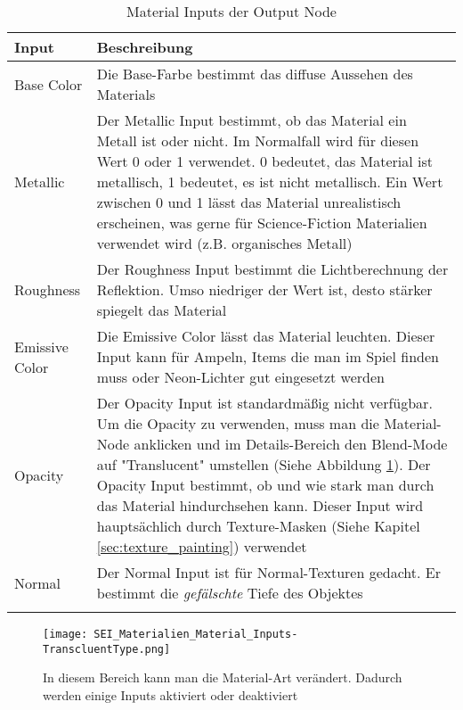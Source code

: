 \begin{longtable}{|p{4cm}|p{9.6cm}|}
    \hline
    \endfirsthead
    \textbf{Input} & \textbf{Beschreibung}\\
    \hline
    \endhead

    Base Color & Die Base-Farbe bestimmt das diffuse Aussehen des Materials \\
    \hline

    Metallic & Der Metallic Input bestimmt, ob das Material ein Metall ist oder nicht. Im Normalfall wird für
    diesen Wert 0 oder 1 verwendet. 0 bedeutet, das Material ist metallisch, 1 bedeutet, es ist nicht
    metallisch. Ein Wert zwischen 0 und 1 lässt das Material unrealistisch erscheinen, was gerne
    für Science-Fiction Materialien verwendet wird (z.B. organisches Metall) \\
    \hline

    Roughness & Der Roughness Input bestimmt die Lichtberechnung der Reflektion. Umso niedriger der Wert
    ist, desto stärker spiegelt das Material \\
    \hline

    Emissive Color & Die Emissive Color lässt das Material leuchten. Dieser Input kann für Ampeln, Items die man im Spiel
    finden muss oder Neon-Lichter gut eingesetzt werden \\
    \hline

    Opacity & Der Opacity Input ist standardmäßig nicht verfügbar. Um die Opacity zu verwenden, muss man die
    Material-Node anklicken und im Details-Bereich den Blend-Mode auf "Translucent" umstellen (Siehe
    Abbildung \ref{picture:translucent}). Der Opacity Input bestimmt, ob und wie stark man durch das Material hindurchsehen
    kann. Dieser Input wird hauptsächlich durch Texture-Masken (Siehe Kapitel \ref{sec:texture_painting}) verwendet \\
    \hline

    Normal & Der Normal Input ist für Normal-Texturen gedacht. Er bestimmt die \textit{gefälschte} Tiefe des Objektes \\
    \hline

    \caption{Material Inputs der Output Node}
    \label{table:mat_inputs}
\end{longtable}

\begin{figure}[H]
    \centering
    \texttt{[image: SEI\_Materialien\_Material\_Inputs-TranscluentType.png]}
    \caption{In diesem Bereich kann man die Material-Art verändert. Dadurch werden einige Inputs aktiviert oder deaktiviert}
    \label{picture:translucent}
\end{figure}


